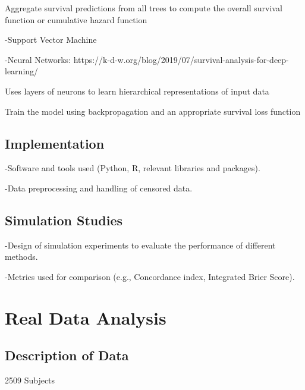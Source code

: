 \documentclass{article}
\begin{document}
Aggregate survival predictions from all trees to compute the overall survival function or cumulative hazard function

-Support Vector Machine

-Neural Networks: https://k-d-w.org/blog/2019/07/survival-analysis-for-deep-learning/

Uses layers of neurons to learn hierarchical representations of input data

Train the model using backpropagation and an appropriate survival loss function

\subsection{Implementation}
-Software and tools used (Python, R, relevant libraries and packages).

-Data preprocessing and handling of censored data.

\subsection{Simulation Studies}
-Design of simulation experiments to evaluate the performance of different methods.

-Metrics used for comparison (e.g., Concordance index, Integrated Brier Score).

\section{Real Data Analysis}
\subsection{Description of Data}
2509 Subjects
\end{document}
